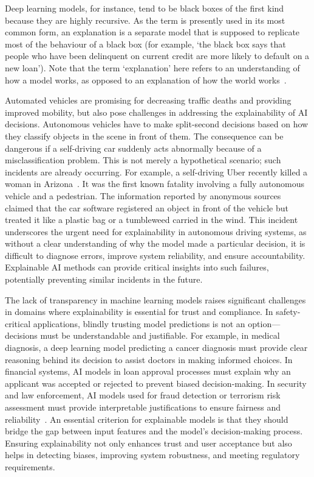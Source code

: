 Deep learning models, for instance, tend to be black boxes of the first kind because they are highly recursive. As the term is presently used in its most common form, an explanation is a separate model that is supposed to replicate most of the behaviour of a black box (for example, ‘the black box says that people who have been delinquent on current credit are more likely to default on a new loan’). Note that the term ‘explanation’ here refers to an understanding of how a model works, as opposed to an explanation of how the world works~\cite{Rudin2019}.

Automated vehicles are promising for decreasing traffic deaths and providing improved mobility, but also pose challenges in addressing the explainability of AI decisions. Autonomous vehicles have to make split-second decisions based on how they classify objects in the scene in front of them. The consequence can be dangerous if a self-driving car suddenly acts abnormally because of a misclassification problem. This is not merely a hypothetical scenario; such incidents are already occurring. For example, a self-driving Uber recently killed a woman in Arizona~\autocite{marshall2019uber}. It was the first known fatality involving a fully autonomous vehicle and a pedestrian. The information reported by anonymous sources claimed that the car software registered an object in front of the vehicle but treated it like a plastic bag or a tumbleweed carried in the wind. This incident underscores the urgent need for explainability in autonomous driving systems, as without a clear understanding of why the model made a particular decision, it is difficult to diagnose errors, improve system reliability, and ensure accountability. Explainable AI methods can provide critical insights into such failures, potentially preventing similar incidents in the future.


The lack of transparency in machine learning models raises significant challenges in domains where explainability is essential for trust and compliance. In safety-critical applications, blindly trusting model predictions is not an option—decisions must be understandable and justifiable. For example, in medical diagnosis, a deep learning model predicting a cancer diagnosis must provide clear reasoning behind its decision to assist doctors in making informed choices. In financial systems, AI models in loan approval processes must explain why an applicant was accepted or rejected to prevent biased decision-making. In security and law enforcement, AI models used for fraud detection or terrorism risk assessment must provide interpretable justifications to ensure fairness and reliability~\autocite{ribeiro2016ML}. An essential criterion for explainable models is that they should bridge the gap between input features and the model’s decision-making process. Ensuring explainability not only enhances trust and user acceptance but also helps in detecting biases, improving system robustness, and meeting regulatory requirements.

